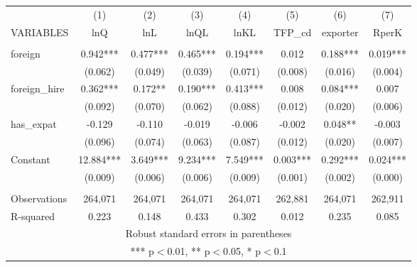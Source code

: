 \begin{tabular}{lccccccc} \hline
 & (1) & (2) & (3) & (4) & (5) & (6) & (7) \\
VARIABLES & lnQ & lnL & lnQL & lnKL & TFP\_cd & exporter & RperK \\ \hline
 &  &  &  &  &  &  &  \\
foreign & 0.942*** & 0.477*** & 0.465*** & 0.194*** & 0.012 & 0.188*** & 0.019*** \\
 & (0.062) & (0.049) & (0.039) & (0.071) & (0.008) & (0.016) & (0.004) \\
foreign\_hire & 0.362*** & 0.172** & 0.190*** & 0.413*** & 0.008 & 0.084*** & 0.007 \\
 & (0.092) & (0.070) & (0.062) & (0.088) & (0.012) & (0.020) & (0.006) \\
has\_expat & -0.129 & -0.110 & -0.019 & -0.006 & -0.002 & 0.048** & -0.003 \\
 & (0.096) & (0.074) & (0.063) & (0.087) & (0.012) & (0.020) & (0.007) \\
Constant & 12.884*** & 3.649*** & 9.234*** & 7.549*** & 0.003*** & 0.292*** & 0.024*** \\
 & (0.009) & (0.006) & (0.006) & (0.009) & (0.001) & (0.002) & (0.000) \\
 &  &  &  &  &  &  &  \\
Observations & 264,071 & 264,071 & 264,071 & 264,071 & 262,881 & 264,071 & 262,911 \\
 R-squared & 0.223 & 0.148 & 0.433 & 0.302 & 0.012 & 0.235 & 0.085 \\ \hline
\multicolumn{8}{c}{ Robust standard errors in parentheses} \\
\multicolumn{8}{c}{ *** p$<$0.01, ** p$<$0.05, * p$<$0.1} \\
\end{tabular}
